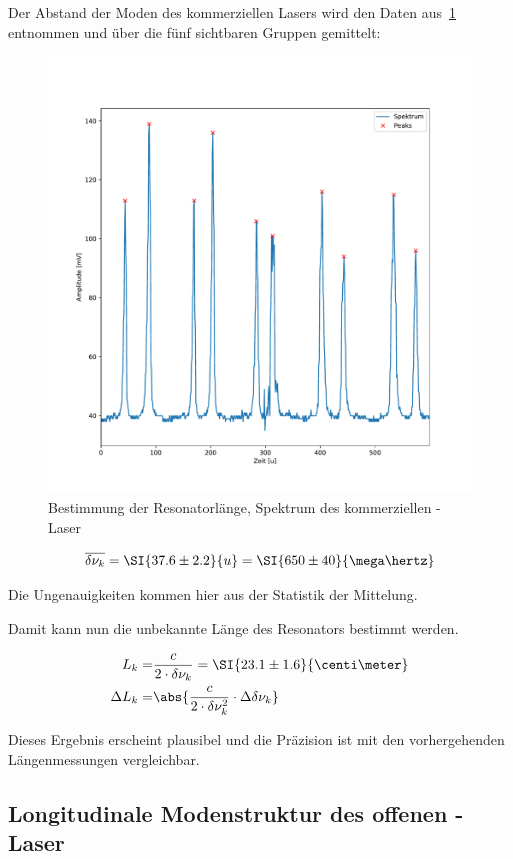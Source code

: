 \documentclass[slug=GL, room=HZDR\ Dresden/Rossendorf\,\ Geb.\ 620/123, supervisor=Tim\ Ziegler]{../../Lab_Report_LaTeX/lab_report}
\newcommand{\hne}{\ce{HeNe}-Laser}
\begin{document}
Der Abstand der Moden des kommerziellen Lasers wird den Daten
aus~\ref{fig:lengthkomm} entnommen und \"uber die fünf sichtbaren Gruppen
gemittelt:
\begin{figure}[b]\centering
  \includegraphics[width=.8\columnwidth]{figs/komm_all_peaks.pdf}
  \caption{Bestimmung der Resonatorl\"ange, Spektrum des kommerziellen \hne{}}
  \label{fig:lengthkomm}
\end{figure}
\begin{equation}
  \label{eq:modeabstkom}
  \overline{\delta\nu_k}=\SI{37.6\pm 2.2}{u}=\SI{650\pm 40}{\mega\hertz}
\end{equation}

Die Ungenauigkeiten kommen hier aus der Statistik der Mittelung.

Damit kann nun die unbekannte L\"ange des Resonators bestimmt werden.

\begin{align}
  L_k =& \frac{c}{2\cdot \delta\nu_k} = \SI{23.1\pm 1.6}{\centi\meter}
  \\
  \Delta L_k =& \abs{\frac{c}{2\cdot\delta\nu_k^2}\cdot \Delta\delta\nu_k}
\end{align}

Dieses Ergebnis erscheint plausibel und die Pr\"azision ist mit den
vorhergehenden L\"angenmessungen vergleichbar.

\subsection{Longitudinale Modenstruktur des offenen \hne{}}
\label{sec:longoff}
\end{document}
